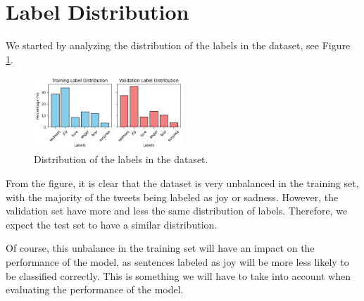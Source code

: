\section{Label Distribution}
We started by analyzing the distribution of the labels in the dataset, see Figure \ref{fig:label_dist}.
\begin{figure}[H]
    \vspace*{0.7cm}
    \centering
    \includegraphics[width=0.5\textwidth]{figures/label_dist.png}
    \caption{Distribution of the labels in the dataset.}
    \label{fig:label_dist}
    \vspace*{0.7cm}
\end{figure}
From the figure, it is clear that the dataset is very unbalanced in the training set, with the majority of the tweets being labeled as joy or sadness. However, the validation set have more and less the same distribution of labels. Therefore, we expect the test set to have a similar distribution.

Of course, this unbalance in the training set will have an impact on the performance of the model, as sentences labeled as joy will be more less likely to be classified correctly. This is something we will have to take into account when evaluating the performance of the model.